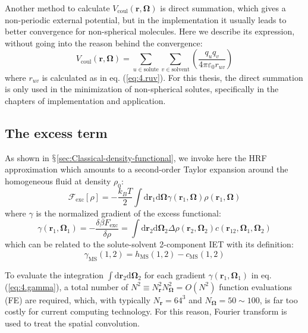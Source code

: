 Another method to calculate $V_{\mathrm{coul}}(\mathbf{r},\mathbf{\Omega})$
is direct summation, which gives a non-periodic external potential,
but in the implementation it usually leads to better convergence for
non-spherical molecules. Here we describe its expression, without going into the reason
behind the convergence:
\begin{equation}
V_{\mathrm{coul}}(\mathbf{r},\mathbf{\Omega})=\sum_{u\in\mathrm{solute}}\sum_{v\in\mathrm{solvent}}\left(\dfrac{q_{u}q_{v}}{4\pi\varepsilon_{0}r_{uv}}\right)
\end{equation}
where $r_{uv}$ is calculated as in eq. (\ref{eq:4.ruv}). For
this thesis, the direct summation is only used in the minimization
of non-spherical solutes, specifically in the chapters of implementation and application.

\subsection{The excess term\label{subsec:The-excess-term}}

As shown in $\mathsection$\ref{sec:Classical-density-functional},
we invoke here the \acs{HRF} approximation which amounts to a second-order
Taylor expansion around the homogeneous fluid at density $\rho_{0}$:
\begin{equation}
\mathcal{F}_{\mathrm{exc}}[\rho]=-\frac{k_{B}T}{2}\int\mathrm{d}\mathbf{r}_{1}\mathrm{d}\mathbf{\mathbf{\Omega}}\gamma(\mathbf{r}_{1},\mathbf{\mathbf{\mathbf{\mathbf{\Omega}}}})\rho(\mathbf{r}_{1},\mathbf{\mathbf{\mathbf{\mathbf{\Omega}}}})\label{eq:4.fexc}
\end{equation}
where $\gamma$ is the normalized gradient of the excess functional:
\begin{equation}
\gamma(\mathbf{r}_{1},\mathbf{\Omega}_{1})=-\frac{\delta\beta F_{\mathrm{exc}}}{\delta\rho}=\int\mathrm{d}\mathbf{r}_{2}\mathrm{d}\mathbf{\Omega}_{2}\Delta\rho(\mathbf{r}_{2},\mathbf{\Omega}_{2})c(\mathbf{r}_{12},\mathbf{\Omega}_{1},\mathbf{\Omega}_{2})\label{eq:4.gamma}
\end{equation}
which can be related to the solute-solvent 2-component \acs{IET}
with its definition:
\begin{equation}
\gamma_{\mathrm{MS}}(1,2)=h_{\mathrm{MS}}(1,2)-c_{\mathrm{MS}}(1,2)
\end{equation}

To evaluate the integration $\int\mathrm{d}\mathbf{r}_{2}\mathrm{d}\mathbf{\Omega}_{2}$
for each gradient $\gamma(\mathbf{r}_{1},\mathbf{\Omega}_{1})$ in
eq. (\ref{eq:4.gamma}), a total number of $N^{2}\equiv N_{\mathbf{r}}^{2}N_{\mathbf{\Omega}}^{2}=O(N^{2})$
function evaluations (\acs{FE}) are required, which, with typically
$N_{\mathbf{r}}=64^{3}$ and $N_{\mathbf{\Omega}}=50\sim100$, is
far too costly for current computing technology. For this reason,
Fourier transform is used to treat the spatial convolution.

